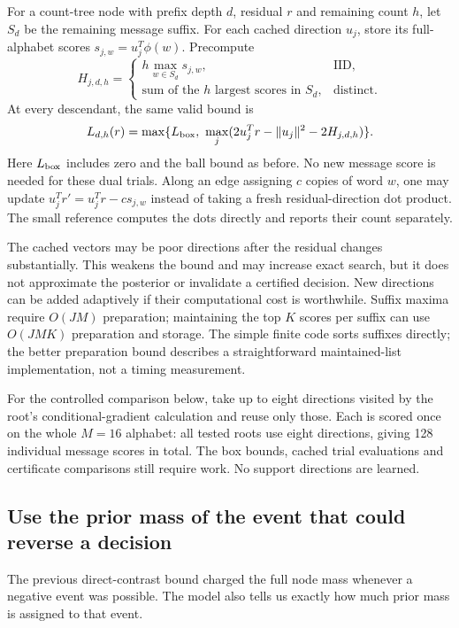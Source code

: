 \documentclass[10pt,a4paper]{article}
\begin{document}
For a count-tree node with prefix depth $d$, residual $r$ and remaining count $h$, let
$S_d$ be the remaining message suffix. For each cached direction $u_j$, store its full-alphabet scores
$s_{j,w}=u_j^T\phi(w)$. Precompute
\[
 H_{j,d,h}=
 \begin{cases}
 h\max_{w\in S_d}s_{j,w},&\text{IID},\\
 \text{sum of the $h$ largest scores in $S_d$},&\text{distinct}.
 \end{cases}
\]
At every descendant, the same valid bound is
\begin{equation}
 L_{d,h}(r)=\max\{L_{\rm box},\ \max_j(2u_j^Tr-\|u_j\|^2-2H_{j,d,h})\}.
 \label{eq:cached-support-bound}
\end{equation}
Here $L_{\rm box}$ includes zero and the ball bound as before. No new message score is needed for these
dual trials. Along an edge assigning $c$ copies of word $w$, one may update
$u_j^Tr'=u_j^Tr-cs_{j,w}$ instead of taking a fresh residual-direction dot product.
The small reference computes the dots directly and reports their count separately.

The cached vectors may be poor directions after the residual changes substantially. This weakens the bound
and may increase exact search, but it does not approximate the posterior or invalidate a certified decision.
New directions can be added adaptively if their computational cost is worthwhile.
Suffix maxima require $O(JM)$ preparation; maintaining the top $K$ scores per suffix can use
$O(JMK)$ preparation and storage. The simple finite code sorts suffixes directly; the better preparation bound
describes a straightforward maintained-list implementation, not a timing measurement.

For the controlled comparison below, take up to eight directions visited by the root's conditional-gradient
calculation and reuse only those. Each is scored once on the whole $M=16$ alphabet: all tested roots use eight
directions, giving 128 individual message scores in total. The box bounds, cached trial evaluations and
certificate comparisons still require work. No support directions are learned.

\clearpage
\subsection{Use the prior mass of the event that could reverse a decision}
The previous direct-contrast bound charged the full node mass whenever a negative event was possible.
The model also tells us exactly how much prior mass is assigned to that event.
\end{document}
